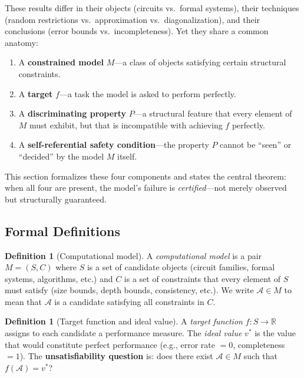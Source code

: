 \documentclass[11pt,a4paper]{article}
\theoremstyle{plain}
\theoremstyle{definition}
\newtheorem{definition}[theorem]{Definition}
\theoremstyle{remark}
\begin{document}
These results differ in their objects (circuits vs.\ formal systems), their techniques (random restrictions vs.\ approximation vs.\ diagonalization), and their conclusions (error bounds vs.\ incompleteness). Yet they share a common anatomy:

\begin{enumerate}
\item A \textbf{constrained model} $M$---a class of objects satisfying certain structural constraints.
\item A \textbf{target} $f$---a task the model is asked to perform perfectly.
\item A \textbf{discriminating property} $P$---a structural feature that every element of $M$ must exhibit, but that is incompatible with achieving $f$ perfectly.
\item A \textbf{self-referential safety condition}---the property $P$ cannot be ``seen'' or ``decided'' by the model $M$ itself.
\end{enumerate}

This section formalizes these four components and states the central theorem: when all four are present, the model's failure is \emph{certified}---not merely observed but structurally guaranteed.

\subsection{Formal Definitions}

\begin{definition}[Computational model]
\label{def:model}
A \emph{computational model} is a pair $M = (S, C)$ where $S$ is a set of candidate objects (circuit families, formal systems, algorithms, etc.) and $C$ is a set of constraints that every element of $S$ must satisfy (size bounds, depth bounds, consistency, etc.). We write $\mathcal{A} \in M$ to mean that $\mathcal{A}$ is a candidate satisfying all constraints in $C$.
\end{definition}

\begin{definition}[Target function and ideal value]
\label{def:target}
A \emph{target function} $f: S \to \mathbb{R}$ assigns to each candidate a performance measure. The \emph{ideal value} $v^*$ is the value that would constitute perfect performance (e.g., error rate $= 0$, completeness $= 1$). The \textbf{unsatisfiability question} is: does there exist $\mathcal{A} \in M$ such that $f(\mathcal{A}) = v^*$?
\end{definition}
\end{document}
